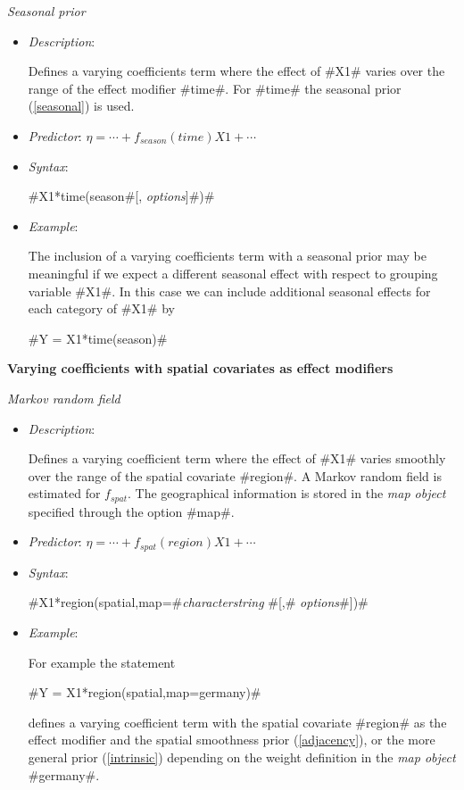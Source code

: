 {\em Seasonal prior}
\begin{itemize}
\item[] {\em Description}:

Defines a varying coefficients term where the effect of #X1# varies
over the range of the effect modifier #time#. For #time# the
seasonal prior (\ref{seasonal}) is used.
\item[] {\em Predictor}: $\eta= \cdots + f_{season}(time)X1 + \cdots $
\item[] {\em Syntax}:

#X1*time(season#[, {\em options}]#)#
\item[] {\em Example}:

The inclusion of a varying coefficients term with a seasonal prior
may be meaningful if we expect a different seasonal effect with
respect to grouping variable #X1#. In this case we can include
additional seasonal effects for each category of #X1# by

#Y = X1*time(season)#

\end{itemize}


{\bf Varying coefficients with spatial covariates as effect
modifiers} \medskip

{\em Markov random field}

\begin{itemize}
\item[] {\em Description}:

Defines a varying coefficient term where the effect of #X1# varies
smoothly over the range of the spatial covariate #region#. A
Markov random field is estimated for $f_{spat}$. The geographical
information is stored in the {\em map object} specified through the
option #map#.
\item[] {\em Predictor}: $\eta = \cdots + f_{spat}(region)X1 + \cdots$
\item[] {\em Syntax}:

#X1*region(spatial,map=#{\it characterstring} #[,# {\it options}#])#
\item[] {\em Example}:

For example the statement

#Y = X1*region(spatial,map=germany)#

defines a varying coefficient term with the spatial covariate
#region# as the effect modifier and the spatial smoothness prior
(\ref{adjacency}), or the more general prior (\ref{intrinsic})
depending on the weight definition in the {\em map object} #germany#.
\end{itemize}


